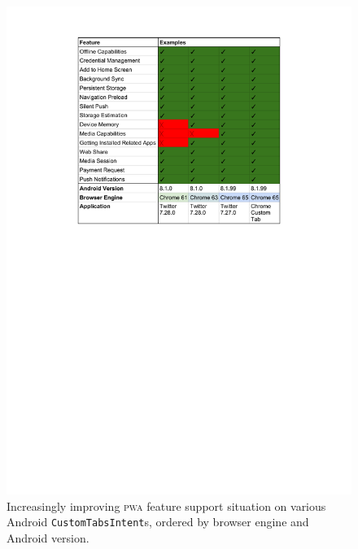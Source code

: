 \documentclass[sigconf]{acmart}
\begin{document}
\begin{figure}[t]
  \renewcommand{\figurename}{Table}
  \begin{center}
  \centerline{\includegraphics[width=.65\columnwidth,trim=4.3cm 16.4cm 4.3cm 1.5cm, clip]{custom-tab-results.pdf}}
  \caption{Increasingly improving \textsc{pwa} feature support situation
    on various Android \texttt{CustomTabsIntent}s,
    ordered by browser engine and Android version.}
  \label{table:customtab}
  \end{center}
\end{figure}
\end{document}
